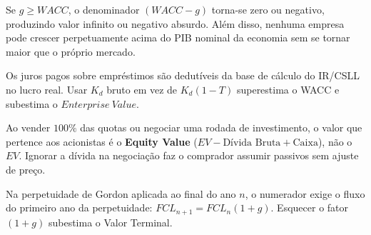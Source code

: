 
\begin{boxErro}
Se $g \ge WACC$, o denominador $(WACC - g)$ torna-se zero ou negativo, produzindo valor infinito ou negativo absurdo. Além disso, nenhuma empresa pode crescer perpetuamente acima do PIB nominal da economia sem se tornar maior que o próprio mercado.
\end{boxErro}

\begin{boxErro}
Os juros pagos sobre empréstimos são dedutíveis da base de cálculo do IR/CSLL no lucro real. Usar $K_d$ bruto em vez de $K_d(1-T)$ superestima o WACC e subestima o $Enterprise\ Value$.
\end{boxErro}

\begin{boxErro}
Ao vender $100\%$ das quotas ou negociar uma rodada de investimento, o valor que pertence aos acionistas é o \textbf{Equity Value} ($EV - \text{Dívida Bruta} + \text{Caixa}$), não o $EV$. Ignorar a dívida na negociação faz o comprador assumir passivos sem ajuste de preço.
\end{boxErro}

\begin{boxErro}
Na perpetuidade de Gordon aplicada ao final do ano $n$, o numerador exige o fluxo do primeiro ano da perpetuidade: $FCL_{n+1} = FCL_n (1+g)$. Esquecer o fator $(1+g)$ subestima o Valor Terminal.
\end{boxErro}


